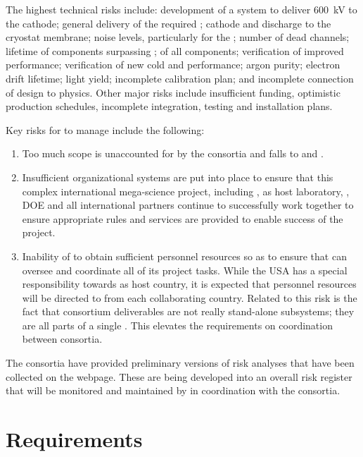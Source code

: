 The highest technical risks include: development of a system to
deliver \SI{600}{kV} to the \dual cathode; general delivery of the
required ; cathode and  discharge to the cryostat
membrane; noise levels, particularly for the ; %
number of dead channels; lifetime of components surpassing \dunelifetime{}; %
 of all components; verification of improved 
performance; verification of new cold   and   performance;
argon purity; electron drift lifetime; \phel light yield;
incomplete calibration plan; and incomplete connection of design to
physics. Other major risks include insufficient funding, optimistic
production schedules, incomplete integration, testing and installation
plans.

Key risks for  to manage include the following:
\begin{enumerate}
\item Too much scope is unaccounted for by the consortia and falls
  to  and .
\item Insufficient organizational systems are put into place to
  ensure that this complex international mega-science project,
  including , \fnal as host laboratory, \surf, DOE and all international
  partners continue to successfully work together to ensure
  appropriate rules and services are provided to enable success of
  the project.
\item Inability of  to obtain sufficient personnel resources so as to
  ensure that  can oversee and coordinate all of its
  project tasks.  While the USA has a special responsibility towards
   as host country, it is expected that personnel resources will
  be directed to  from each collaborating country. Related to this
  risk is the fact that consortium deliverables are not really
  stand-alone subsystems; they are all parts of a single . This
  elevates the requirements on coordination between consortia.
\end{enumerate}

The consortia have provided preliminary versions of risk analyses that
have been collected on the  webpage. These are being developed into
an overall risk register that will be monitored and maintained by 
in coordination with the consortia.

\section{Requirements}
\label{sec:fdsp-coord-requirements}

